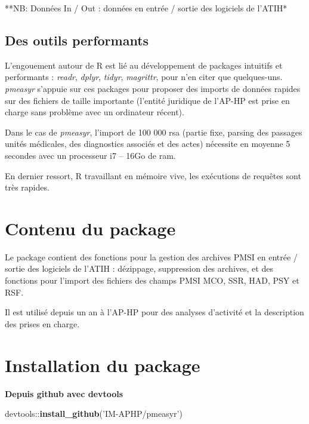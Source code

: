 \documentclass[]{book}
\newenvironment{Shaded}{\begin{snugshade}}{\end{snugshade}}
\newcommand{\KeywordTok}[1]{\textcolor[rgb]{0.13,0.29,0.53}{\textbf{{#1}}}}
\newcommand{\StringTok}[1]{\textcolor[rgb]{0.31,0.60,0.02}{{#1}}}
\newcommand{\NormalTok}[1]{{#1}}
\begin{document}
**NB: Données In / Out : données en entrée / sortie des logiciels de
l'ATIH*

\subsection{Des outils performants}\label{des-outils-performants}

L'engouement autour de R est lié au développement de packages intuitifs
et performants : \emph{readr}, \emph{dplyr}, \emph{tidyr},
\emph{magrittr}, pour n'en citer que quelques-uns. \emph{pmeasyr}
s'appuie sur ces packages pour proposer des imports de données rapides
sur des fichiers de taille importante (l'entité juridique de l'AP-HP est
prise en charge sans problème avec un ordinateur récent).

Dans le cas de \emph{pmeasyr}, l'import de 100 000 rsa (partie fixe,
parsing des passages unités médicales, des diagnostics associés et des
actes) nécessite en moyenne 5 secondes avec un processeur i7 -- 16Go de
ram.

En dernier ressort, R travaillant en mémoire vive, les exécutions de
requêtes sont très rapides.

\section{Contenu du package}\label{contenu-du-package}

Le package contient des fonctions pour la gestion des archives PMSI en
entrée / sortie des logiciels de l'ATIH : dézippage, suppression des
archives, et des fonctions pour l'import des fichiers des champs PMSI
MCO, SSR, HAD, PSY et RSF.

Il est utilisé depuis un an à l'AP-HP pour des analyses d'activité et la
description des prises en charge.

\section{Installation du package}\label{installation-du-package}

\textbf{Depuis github avec devtools}

\begin{Shaded}
\begin{Highlighting}[]
\NormalTok{devtools::}\KeywordTok{install_github}\NormalTok{(}\StringTok{'IM-APHP/pmeasyr'}\NormalTok{)}
\end{Highlighting}
\end{Shaded}
\end{document}
